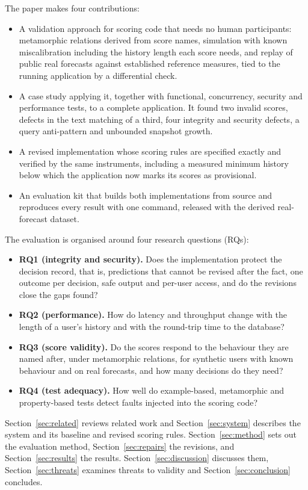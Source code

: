 \documentclass[12pt,a4paper]{article}
\begin{document}
The paper makes four contributions:
\begin{itemize}
\item A validation approach for scoring code that needs no human participants: metamorphic relations derived from score names, simulation with known miscalibration including the history length each score needs, and replay of public real forecasts against established reference measures, tied to the running application by a differential check.
\item A case study applying it, together with functional, concurrency, security and performance tests, to a complete application. It found two invalid scores, defects in the text matching of a third, four integrity and security defects, a query anti-pattern and unbounded snapshot growth.
\item A revised implementation whose scoring rules are specified exactly and verified by the same instruments, including a measured minimum history below which the application now marks its scores as provisional.
\item An evaluation kit that builds both implementations from source and reproduces every result with one command, released with the derived real-forecast dataset.
\end{itemize}

The evaluation is organised around four research questions (RQs):
\begin{itemize}
\item \textbf{RQ1 (integrity and security).} Does the implementation protect the decision record, that is, predictions that cannot be revised after the fact, one outcome per decision, safe output and per-user access, and do the revisions close the gaps found?
\item \textbf{RQ2 (performance).} How do latency and throughput change with the length of a user's history and with the round-trip time to the database?
\item \textbf{RQ3 (score validity).} Do the scores respond to the behaviour they are named after, under metamorphic relations, for synthetic users with known behaviour and on real forecasts, and how many decisions do they need?
\item \textbf{RQ4 (test adequacy).} How well do example-based, metamorphic and property-based tests detect faults injected into the scoring code?
\end{itemize}

Section~\ref{sec:related} reviews related work and Section~\ref{sec:system} describes the system and its baseline and revised scoring rules. Section~\ref{sec:method} sets out the evaluation method, Section~\ref{sec:repairs} the revisions, and Section~\ref{sec:results} the results. Section~\ref{sec:discussion} discusses them, Section~\ref{sec:threats} examines threats to validity and Section~\ref{sec:conclusion} concludes.
\end{document}
